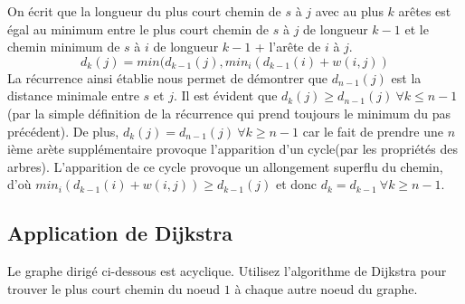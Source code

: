 \begin{solution}
On écrit que la longueur du plus court chemin de $s$ à $j$ avec au plus $k$ arêtes est égal au minimum entre le plus court chemin de $s$ à $j$ de longueur $k-1$ et le chemin minimum de $s$ à $i$ de longueur $k-1$ + l'arête de $i$ à $j$.
$$d_k(j) = min (d_{k-1}(j) , min_i(d_{k-1}(i)+w(i, j))$$
La récurrence ainsi établie nous permet de démontrer que $d_{n-1}(j)$ est la distance minimale entre $s$ et $j$. Il est évident que $d_k(j)\ge d_{n-1}(j)\ \forall k \le n-1$ (par la simple définition de la récurrence qui prend toujours le minimum du pas précédent). De plus, $d_k(j) = d_{n-1}(j)\ \forall k \ge n-1$ car le fait de prendre une $n$ième arète supplémentaire provoque l'apparition d'un cycle(par les propriétés des arbres). L'apparition de ce cycle provoque un allongement superflu du chemin, d'où $min_i(d_{k-1}(i)+w(i, j)) \ge d_{k-1}(j)$ et donc $d_k = d_{k-1}\ \forall k \ge n-1$.
\end{solution}

\subsection{Application de Dijkstra} Le graphe dirigé ci-dessous est acyclique. Utilisez l'algorithme de Dijkstra pour trouver le plus court chemin du noeud $1$ à chaque autre noeud du graphe.

\begin{center}
\end{center}

